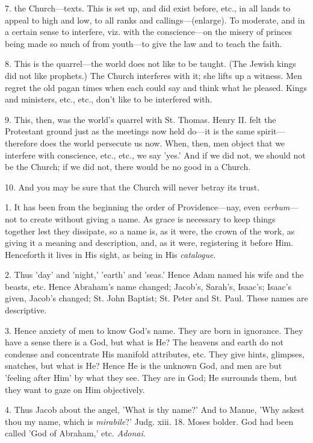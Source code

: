 7. the Church—texts. This is set up, and did
exist before, etc., in all lands to appeal to high and low, to all
ranks and callings—(enlarge). To moderate, and in a certain sense to
interfere, viz. with the conscience—on the misery of princes being
made so much of from youth—to give the law and to teach the faith.

8. This is the quarrel—the world does not like
to be taught. (The Jewish kings did not like prophets.) The Church
interferes with it; she lifts up a witness. Men regret the old pagan
times when each could say and think what he pleased. Kings and
ministers, etc., etc., don't like to be interfered with.

9. This, then, was the world's quarrel with St.
Thomas. Henry II. felt the
Protestant ground just as the meetings now held do—it is the same
spirit—therefore does the world persecute us now. When, then, men
object that we interfere with conscience, etc., etc., we say 'yes.'
And if we did not, we should not be the Church; if we did not,
there would be no good in a Church.

10. And you may be sure that the Church will
never betray its trust.


1. It has been from the beginning the order of
Providence—nay, even \emph{verbum}—not to create without giving a
name. As grace is necessary to keep things together lest they
dissipate, so a name is, as it were, the crown of the work, as giving
it a meaning and description, and, as it were, registering it before
Him. Henceforth it lives in His sight, as being in His \emph{catalogue}.

2. Thus 'day' and 'night,' 'earth' and 'seas.'
Hence Adam named his wife and the beasts, etc. Hence Abraham's name
changed; Jacob's, Sarah's, Isaac's; Isaac's given, Jacob's changed;
St. John Baptist; St. Peter and St. Paul. These names are descriptive.

3. Hence anxiety of men to know God's name. They
are born in ignorance. They have a sense there is a God, but what is
He? The heavens and earth do not condense and concentrate His manifold
attributes, etc. They give hints, glimpses, snatches, but what is He?
Hence He is the unknown God, and men are but 'feeling after Him' by
what they see. They are in God; He surrounds them, but they want to
gaze on Him objectively.

4. Thus Jacob about the angel, 'What is thy
name?' And to Manue, 'Why askest thou my name, which is \emph{mirabile}?'
Judg. xiii. 18. Moses bolder. God had been called 'God of Abraham,'
etc. \emph{Adonai}.

